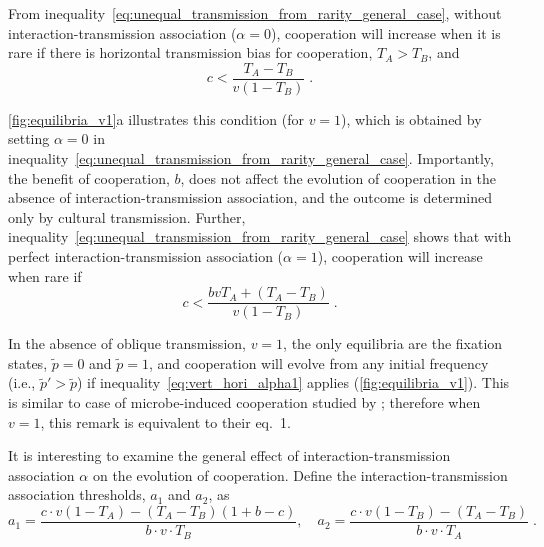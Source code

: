 \documentclass[12pt]{extarticle}
\begin{document}
From inequality~\ref{eq:unequal_transmission_from_rarity_general_case}, without interaction-transmission association ($\alpha=0$), cooperation will increase when it is rare if there is horizontal transmission bias for cooperation, $T_A>T_B$, and
\begin{equation}
\label{eq:vert_hori_alpha0}
c < \frac{T_A - T_B}{v(1-T_B)} \;.
\end{equation}

\autoref{fig:equilibria_v1}a illustrates this condition (for $v=1$), which is obtained by setting $\alpha=0$ in inequality~\ref{eq:unequal_transmission_from_rarity_general_case}.
Importantly, the benefit of cooperation, $b$, does not affect the evolution of cooperation in the absence of interaction-transmission association, and the outcome is determined only by  cultural transmission.
Further, inequality~\ref{eq:unequal_transmission_from_rarity_general_case} shows that with perfect interaction-transmission association ($\alpha=1$), cooperation will increase when rare if
\begin{equation}\label{eq:vert_hori_alpha1}
c < \frac{b v T_A + (T_A - T_B)}{v(1-T_B)} \;.
\end{equation}

In the absence of oblique transmission, $v=1$, the only equilibria are the fixation states, $\tilde{p}=0$ and $\tilde{p}=1$, and cooperation will evolve from any initial frequency (i.e., $\tilde{p}'>\tilde{p}$) if inequality~\ref{eq:vert_hori_alpha1} applies (\autoref{fig:equilibria_v1}).
This is similar to case of microbe-induced cooperation studied by \citet{lewin2017microbes}; therefore when $v=1$, this remark is equivalent to their eq.~1.

It is interesting to examine the general effect of interaction-transmission association $\alpha$ on the evolution of cooperation.
Define the interaction-transmission association thresholds, $a_1$ and $a_2$, as 
\begin{equation} \label{eq:boundries_assortative_meeting_general_case}
  a_1 = \frac{c\cdot v(1-T_A) -(T_A-T_B)(1+b-c)}{b\cdot v \cdot T_B}, \quad
  a_2 = \frac{c\cdot v(1-T_B)-(T_A-T_B)}{b\cdot v\cdot T_A} \;.
\end{equation}
\end{document}
